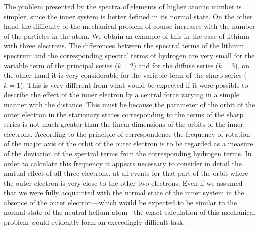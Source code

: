 The problem presented by the spectra of elements of higher
atomic number is simpler, since the inner system is better defined
in its normal state. On the other hand the difficulty of the mechanical
problem of course increases with the number of the particles in
the atom. We obtain an example of this in the case of lithium
with three electrons. The differences between the spectral terms
of the lithium spectrum and the corresponding spectral terms of
hydrogen are very small for the variable term of the principal series
($k = 2$) and for the diffuse series ($k = 3$), on the other hand it is very
considerable for the variable term of the sharp series ($k = 1$). This
is very different from what would be expected if it were possible to
describe the effect of the inner electron by a central force varying
in a simple manner with the distance. This must be because the
parameter of the orbit of the outer electron in the stationary states
corresponding to the terms of the sharp series is not much greater
than the linear dimensions of the orbits of the inner electrons.
According to the principle of correspondence the frequency of rotation
of the major axis of the orbit of the outer electron is to be regarded
as a measure of the deviation of the spectral terms from the corresponding
hydrogen terms. In order to calculate this frequency it
appears necessary to consider in detail the mutual effect of all three
electrons, at all events for that part of the orbit where the outer
electron is very close to the other two electrons. Even if we assumed
that we were fully acquainted with the normal state of the inner
system in the absence of the outer electron---which would be
expected to be similar to the normal state of the neutral helium
atom---the exact calculation of this mechanical problem would
evidently form an exceedingly difficult task.

